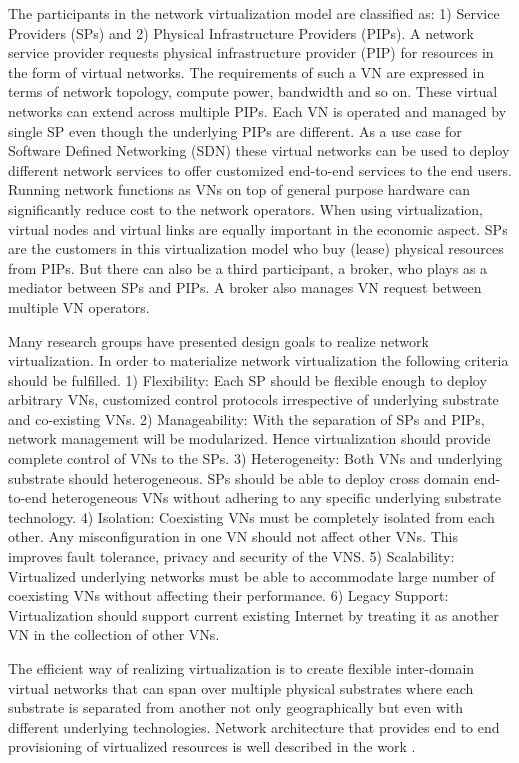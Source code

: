 \documentclass[article,dr=phil,type=msc ,colorback,accentcolor=tud4b]{tudthesis}
\begin{document}
The participants in the network virtualization model are classified as: 1) Service Providers (SPs) and 2) Physical Infrastructure Providers (PIPs). A network service provider requests physical infrastructure provider (PIP) for resources in the form of virtual networks. The requirements of such a VN are expressed in terms of network topology, compute power, bandwidth and so on. These virtual networks can extend across multiple PIPs. Each VN is operated and managed by single SP even though the underlying PIPs are different. As a use case for Software Defined Networking (SDN) these virtual networks can be used to deploy different network services to offer customized end-to-end services to the end users. Running network functions as VNs on top of general purpose hardware can significantly reduce cost to the network operators. When using virtualization, virtual nodes and virtual links are equally important in the economic aspect. SPs are the customers in this virtualization model who buy (lease) physical resources from PIPs. But there can also be a third participant, a broker, who plays as a mediator between SPs and PIPs. A broker also manages VN request between multiple VN operators.\newline

Many research groups have presented design goals to realize network virtualization. In order to materialize network virtualization the following criteria should be fulfilled. 1) Flexibility:  Each SP should be flexible enough to deploy arbitrary VNs, customized control protocols irrespective of underlying substrate and co-existing VNs. 2) Manageability: With the separation of SPs and PIPs, network management will be modularized. Hence virtualization should provide complete control of VNs to the SPs. 3) Heterogeneity: Both VNs and underlying substrate should heterogeneous. SPs should be able to deploy cross domain end-to-end heterogeneous VNs without adhering to any specific underlying substrate technology. 4) Isolation: Coexisting VNs must be completely isolated from each other. Any misconfiguration in one VN should not affect other VNs. This improves fault tolerance, privacy and security of the VNS. 5) Scalability: Virtualized underlying networks must be able to accommodate large number of coexisting VNs without affecting their performance. 6) Legacy Support: Virtualization should support current existing Internet by treating it as another VN in the collection of other VNs.\newline

The efficient way of realizing virtualization is to create flexible inter-domain virtual networks that can span over multiple physical substrates where each substrate is separated from another not only geographically but even with different underlying technologies. Network architecture that provides end to end provisioning of virtualized resources is well described in the work \cite {arc_vn_mgmt}.
\end{document}
